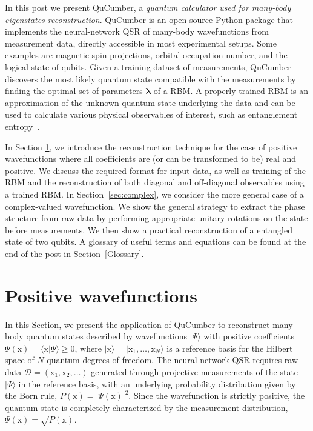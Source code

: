 \documentclass[submission, Phys, hidelinks]{SciPost}
\begin{document}
In this post we present QuCumber, a {\it quantum calculator used for many-body eigenstates reconstruction}. QuCumber is an open-source Python package that implements the neural-network QSR of many-body wavefunctions from measurement data, directly accessible in most experimental setups. Some examples are magnetic spin projections, orbital occupation number, and the logical state of qubits. Given a training dataset of measurements, QuCumber discovers the most likely quantum state compatible with the measurements by finding the optimal set of parameters $\bm{\lambda}$ of a RBM. A properly trained RBM is an approximation of the unknown quantum state underlying the data and can be used to calculate various physical observables of interest, such as entanglement entropy~\cite{torlai2018tomography}.

In Section \ref{sec:positive}, we introduce the reconstruction technique for the case of positive wavefunctions where all coefficients are (or can be transformed to be) real and positive. We discuss the required format for input data, as well as training of the RBM and the reconstruction of both diagonal and off-diagonal observables using a trained RBM. In Section~\ref{sec:complex}, we consider the more general case of a complex-valued wavefunction. We show the general strategy to extract the phase structure from raw data by performing appropriate unitary rotations on the state before measurements. We then show a practical reconstruction of a entangled state of two qubits. A glossary of useful terms and equations can be found at the end of the post in Section~\ref{Glossary}.

\section{Positive wavefunctions}\label{sec:positive}
In this Section, we present the application of QuCumber to reconstruct many-body quantum states described by wavefunctions $|\Psi\rangle$ with positive coefficients $\Psi(\bm{\mathrm{x}})=\langle\bm{\mathrm{x}}|\Psi\rangle \ge0$, where $|\bm{\mathrm{x}}\rangle=|\mathrm{x}_1,\dots,\mathrm{x}_N\rangle$ is a reference basis for the Hilbert space of $N$ quantum degrees of freedom. The neural-network QSR requires raw data $\mathcal{D}=(\bm{\mathrm{x}}_1,\bm{\mathrm{x}}_2,\dots)$ generated through projective measurements of the state $|\Psi\rangle$ in the reference basis, with an underlying probability distribution given by the Born rule, $P(\bm{\mathrm{x}})=|\Psi(\bm{\mathrm{x}})|^2$. Since the wavefunction is strictly positive, the quantum state is completely characterized by the measurement distribution, $\Psi(\bm{\mathrm{x}})=\sqrt{P(\bm{\mathrm{x}})}$. 
\end{document}
